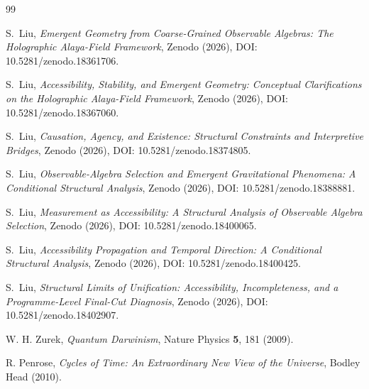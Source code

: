 \documentclass[12pt,a4paper]{article}
\begin{document}
\begin{thebibliography}{99}

S.~Liu, \emph{Emergent Geometry from Coarse-Grained Observable Algebras: The Holographic Alaya-Field Framework}, Zenodo (2026), DOI: 10.5281/zenodo.18361706.

S.~Liu, \emph{Accessibility, Stability, and Emergent Geometry: Conceptual Clarifications on the Holographic Alaya-Field Framework}, Zenodo (2026), DOI: 10.5281/zenodo.18367060.

S.~Liu, \emph{Causation, Agency, and Existence: Structural Constraints and Interpretive Bridges}, Zenodo (2026), DOI: 10.5281/zenodo.18374805.

S.~Liu, \emph{Observable-Algebra Selection and Emergent Gravitational Phenomena: A Conditional Structural Analysis}, Zenodo (2026), DOI: 10.5281/zenodo.18388881.

S.~Liu, \emph{Measurement as Accessibility: A Structural Analysis of Observable Algebra Selection}, Zenodo (2026), DOI: 10.5281/zenodo.18400065.

S.~Liu, \emph{Accessibility Propagation and Temporal Direction: A Conditional Structural Analysis}, Zenodo (2026), DOI: 10.5281/zenodo.18400425.

S.~Liu, \emph{Structural Limits of Unification: Accessibility, Incompleteness, and a Programme-Level Final-Cut Diagnosis}, Zenodo (2026), DOI: 10.5281/zenodo.18402907.

W. H. Zurek, \emph{Quantum Darwinism}, Nature Physics \textbf{5}, 181 (2009).

R. Penrose, \emph{Cycles of Time: An Extraordinary New View of the Universe}, Bodley Head (2010).

\end{thebibliography}
\end{document}
